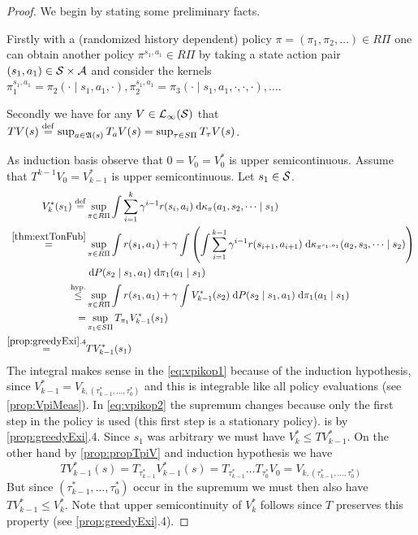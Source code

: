 \begin{proof}
  We begin by stating some preliminary facts.

  Firstly with a (randomized history dependent)
  policy $\pi = (\pi_1, \pi_2, \dots) \in R\Pi$ one can obtain another policy
  $\pi^{s_1, a_1} \in R\Pi$ by taking a state action pair
  $(s_1, a_1) \in \mathcal{S} \times \mathcal{A}$ and consider the kernels
  $\pi_1^{s_1, a_1} = \pi_2(\cdot \mid s_1, a_1, \cdot), 
  \pi_2^{s_1, a_1} = \pi_3(\cdot \mid s_1, a_1, \cdot, \cdot, \cdot),
  \dots$.

  Secondly we have for any $V \in \mathcal{L}_\infty(\mathcal{S})$ that
  $TV(s) \stackrel{\mathrm{def}}{=} \sup_{a \in \frak{A}(s)} T_a V(s)
  = \sup_{\tau \in S\Pi} T_\tau V(s)$.

  As induction basis observe that $0 = V_0 = V_0^*$ is upper semicontinuous.
  Assume that $T^{k-1} V_0 = V^*_{k-1}$ is upper semicontinuous.
  Let $s_1 \in \mathcal{S}$.
  \begin{align}
    V^*_k(s_1) 
    \stackrel{\mathrm{def}}{=} &
    \sup_{\pi \in R\Pi} \int \sum_{i=1}^k \gamma^{i-1} r(s_i, a_i)
    \; \mathrm{d} \kappa_\pi(a_1, s_2, \dots \mid s_1)
    \\
    \stackrel{\ref{thm:extTonFub}}{=} &
    \sup_{\pi \in R\Pi} \int r(s_1, a_1)
     + \gamma \int \left(
      \int \sum_{i=1}^{k-1} \gamma^{i-1} r(s_{i+1}, a_{i+1}) \; \mathrm{d}
      \kappa_{\pi^{s_1, a_1}}(a_2, s_3, \dots \mid s_2)
    \right) 
    \\ & \; \mathrm{d} P(s_2 \mid s_1, a_1) \; \mathrm{d} \pi_1(a_1 \mid s_1)
    \\
    \stackrel{\mathrm{hyp.}} \leq &
    \sup_{\pi \in R\Pi} \int r(s_1, a_1)
    + \gamma \int V^*_{k-1}(s_2)
    \; \mathrm{d} P(s_2 \mid s_1, a_1) \; \mathrm{d} \pi_1(a_1 \mid s_1)
    \label{eq:vpikop1}
    \\
    = &
    \sup_{\pi_1 \in S\Pi} T_{\pi_1} V^*_{k-1}(s_1)
    \label{eq:vpikop2}
    \\ \stackrel{\ref{prop:greedyExi}.4}{=} & T V^*_{k-1}(s_1) 
    \label{eq:vpikop3}
  \end{align}
  The integral makes sense in the \cref{eq:vpikop1} because of the
  induction hypothesis, since
  $V_{k-1}^* = V_{k,(\tau^*_{k-1}, \dots, \tau^*_0)}$ and this
  is integrable like all policy evaluations (see \cref{prop:VpiMeas}).
  In \cref{eq:vpikop2}
  the supremum changes because only the first
  step in the policy is used (this first step is a stationary policy).
   is by \cref{prop:greedyExi}.4.
  Since $s_1$ was arbitrary we must have $V_k^* \leq TV_{k-1}^*$.
  On the other hand by \cref{prop:propTpiV} and induction hypothesis we have
  \[T V^*_{k-1}(s) = T_{\tau^*_{k-1}} V^*_{k-1}(s)
    = T_{\tau^*_{k-1}} \dots T_{\tau^*_0} V_0
  = V_{k, (\tau^*_{k-1}, \dots, \tau^*_0)} \]
  But since $(\tau^*_{k-1}, \dots, \tau^*_0)$ occur in the supremum
  we must then also have $TV_{k-1}^* \leq V^*_k$.
  Note that upper semicontinuity of $V^*_k$ follows since $T$ preserves
  this property (see \cref{prop:greedyExi}.4).
\end{proof}


